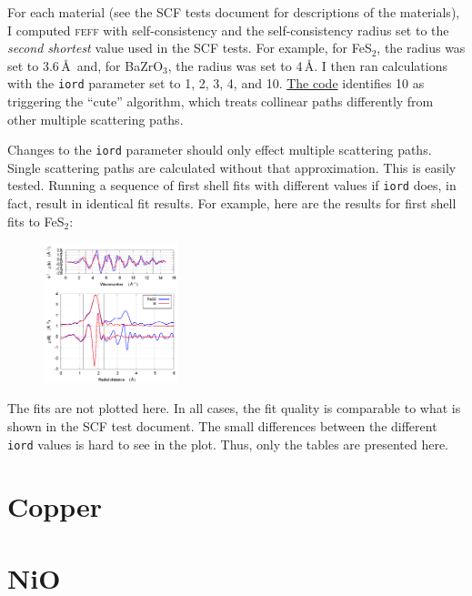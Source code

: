\documentclass{article}
\begin{document}
For each material (see the SCF tests document for descriptions of the
materials), I computed \textsc{feff} with self-consistency and the
self-consistency radius set to the \textit{second shortest} value used
in the SCF tests.  For example, for FeS$_2$, the radius was set to
3.6\,\AA\ and, for BaZrO$_3$, the radius was set to 4\,\AA.  I then
ran calculations with the \texttt{iord} parameter set to 1, 2, 3, 4,
and 10.
\href{https://github.com/xraypy/feff85exafs/blob/master/src/GENFMT/setlam.f#L60}%
{The code} identifies 10 as triggering the ``cute'' algorithm, which
treats collinear paths differently from other multiple scattering
paths.

Changes to the \texttt{iord} parameter should only effect multiple
scattering paths.  Single scattering paths are calculated without that
approximation.  This is easily tested.  Running a sequence of first
shell fits with different values if \texttt{iord} does, in fact,
result in identical fit results.  For example, here are the results
for first shell fits to FeS$_2$:

{
\begin{figure}
  \vspace{-40pt}
  \includegraphics[width=0.35\textwidth]{FeS2/iorder/fit_iorder_02_1st.png}
\end{figure}
\small

}
\clearpage
\normalsize
The fits are not plotted here.  In all cases, the fit quality is
comparable to what is shown in the SCF test document.  The small
differences between the different \texttt{iord} values is hard to see
in the plot.  Thus, only the tables are presented here.

\section{Copper}

\small

\normalsize

\section{NiO}
\end{document}
